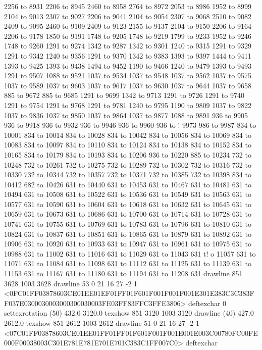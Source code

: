  2256 to 8931 2206 to 8945 2460 to 8958 2764 to 8972 2053 to 8986 1952 to 8999 2104 to 9013 2307 to 9027 2206 to 9041 2104 to 9054 2307 to 9068 2510 to 9082 2409 to 9095 2460 to 9109 2409 to 9123 2155 to 9137 2104 to 9150 2206 to 9164 2206 to 9178 1850 to 9191 1748 to 9205 1748 to 9219 1799 to 9233 1952 to 9246 1748 to 9260 1291 to 9274 1342 to 9287 1342 to 9301 1240 to 9315 1291 to 9329 1291 to 9342 1240 to 9356 1291 to 9370 1342 to 9383 1393 to 9397 1444 to 9411 1393 to 9425 1393 to 9438 1494 to 9452 1190 to 9466 1240 to 9479 1393 to 9493 1291 to 9507 1088 to 9521 1037 to 9534 1037 to 9548 1037 to 9562 1037 to 9575 1037 to 9589 1037 to 9603 1037 to 9617 1037 to 9630 1037 to 9644 1037 to 9658 885 to 9672 885 to 9685 1291 to 9699 1342 to 9713 1291 to 9726 1291 to 9740 1291 to 9754 1291 to 9768 1291 to 9781 1240 to 9795 1190 to 9809 1037 to 9822 1037 to 9836 1037 to 9850 1037 to 9864 1037 to 9877 1088 to 9891 936 to 9905 936 to 9918 936 to 9932 936 to 9946 936 to 9960 936 to !
9973 986 to 9987 834 to 10001 834 
to 10014 834 to 10028 834 to 10042 834 to 10056 834 to 10069 834 to 10083 834 to 10097 834 to 10110 834 to 10124 834 to 10138 834 to 10152 834 to 10165 834 to 10179 834 to 10193 834 to 10206 936 to 10220 885 to 10234 732 to 10248 732 to 10261 732 to 10275 732 to 10289 732 to 10302 732 to 10316 732 to 10330 732 to 10344 732 to 10357 732 to 10371 732 to 10385 732 to 10398 834 to 10412 682 to 10426 631 to 10440 631 to 10453 631 to 10467 631 to 10481 631 to 10494 631 to 10508 631 to 10522 631 to 10536 631 to 10549 631 to 10563 631 to 10577 631 to 10590 631 to 10604 631 to 10618 631 to 10632 631 to 10645 631 to 10659 631 to 10673 631 to 10686 631 to 10700 631 to 10714 631 to 10728 631 to 10741 631 to 10755 631 to 10769 631 to 10783 631 to 10796 631 to 10810 631 to 10824 631 to 10837 631 to 10851 631 to 10865 631 to 10879 631 to 10892 631 to 10906 631 to 10920 631 to 10933 631 to 10947 631 to 10961 631 to 10975 631 to 10988 631 to 11002 631 to 11016 631 to 11029 631 to 11043 631 t!
o 11057 631 to 11071 631 to 11084 
631 to 11098 631 to 11112 631 to 11125 631 to 11139 631 to 11153 631 to 11167 631 to 11180 631 to 11194 631 to 11208 631 drawline
851 3628 1003 3628 drawline
53 0 21 16 27 -2 1 {{<0FC01FF03878603CE01EE01EF01FF01F601F001F001F001E301E383C3C383FF037E0300030003000300030003FE03FF83FFC3FFE3806>}} deftexchar
0 settexrotation
(50) 432.0 3120.0 texshow
851 3120 1003 3120 drawline
(40) 427.0 2612.0 texshow
851 2612 1003 2612 drawline
51 0 21 16 27 -2 1 {{<07C01FF03878603CE01EE01FF01FF01F601F001F001E001E003C00780FC00FE000F00038003C301E781E781E701E701C383C1FF007C0>}} deftexchar
